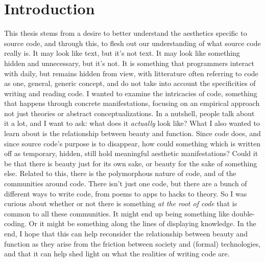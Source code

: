 \section{Introduction}

This thesis stems from a desire to better understand the aesthetics specific to source code, and through this, to flesh out our understanding of what source code really is. It may look like text, but it's not text. It may look like something hidden and unnecessary, but it's not. It is something that programmers interact with daily, but remains hidden from view, with litterature often referring to code as one, general, generic concept, and do not take into account the specificities of writing and reading code. I wanted to examine the intricacies of code, something that happens through concrete manifestations, focusing on an empirical approach not just theories or abstract conceptualizations. In a nutshell, people talk about it a lot, and I want to ask: what does it \emph{actually} look like?
What I also wanted to learn about is the relationship between beauty and function. Since code does, and since source code's purpose is to disappear, how could something which is written off as temporary, hidden, still hold meaningful aesthetic manifestations? Could it be that there is beauty just for its own sake, or beauty for the sake of something else.
Related to this, there is the polymorphous nature of code, and of the communities around code. There isn't just one code, but there are a bunch of different ways to write code, from poems to apps to hacks to theory. So I was curious about whether or not there is something \emph{at the root of code} that is common to all these communities. It might end up being something like double-coding. Or it might be something along the lines of displaying knowledge.
In the end, I hope that this can help reconsider the relationship between beauty and function as they arise from the friction between society and (formal) technologies, and that it can help shed light on what the realities of writing code are.

